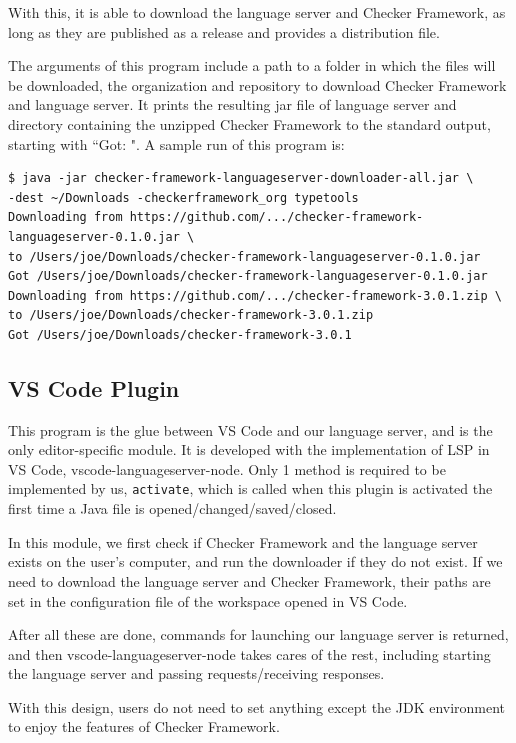 \documentclass{article}
\begin{document}
With this, it is able to download the language server and Checker Framework, as long as they are published as a release and provides a distribution file.

The arguments of this program include a path to a folder in which the files will be downloaded, the organization and repository to download Checker Framework and language server. It prints the resulting jar file of language server and directory containing the unzipped Checker Framework to the standard output, starting with ``Got: ". A sample run of this program is:

\begin{lstlisting}
$ java -jar checker-framework-languageserver-downloader-all.jar \
-dest ~/Downloads -checkerframework_org typetools
Downloading from https://github.com/.../checker-framework-languageserver-0.1.0.jar \
to /Users/joe/Downloads/checker-framework-languageserver-0.1.0.jar
Got /Users/joe/Downloads/checker-framework-languageserver-0.1.0.jar
Downloading from https://github.com/.../checker-framework-3.0.1.zip \
to /Users/joe/Downloads/checker-framework-3.0.1.zip
Got /Users/joe/Downloads/checker-framework-3.0.1
\end{lstlisting}

\subsection{VS Code Plugin}

This program is the glue between VS Code and our language server, and is the only editor-specific module. It is developed with the implementation of LSP in VS Code, vscode-languageserver-node\cite{vslsp}. Only 1 method is required to be implemented by us, \verb|activate|, which is called when this plugin is activated the first time a Java file is opened/changed/saved/closed.

In this module, we first check if Checker Framework and the language server exists on the user's computer, and run the downloader if they do not exist. If we need to download the language server and Checker Framework, their paths are set in the configuration file of the workspace opened in VS Code.

After all these are done, commands for launching our language server is returned, and then vscode-languageserver-node takes cares of the rest, including starting the language server and passing requests/receiving responses.

With this design, users do not need to set anything except the JDK environment to enjoy the features of Checker Framework.
\end{document}
